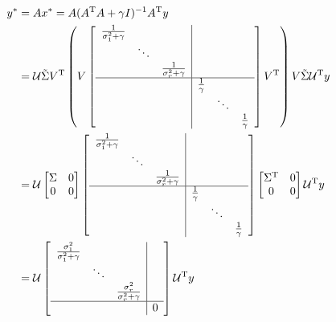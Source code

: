 \begin{align*}
y^* &= Ax^* = A(A^{\trans}A + \gamma I)^{-1}A^{\trans}y\\
&= \mathcal{U}\tilde{\Sigma}V^{\trans}\left(V
\left[
\begin{array}{c|c}
\begin{matrix}
\frac{1}{\sigma_1^2+\gamma} & &\\
&\ddots&\\
&&\frac{1}{\sigma_r^2+\gamma}
\end{matrix}&  \\ \hline 
& \begin{matrix}
\frac{1}{\gamma} & &\\
&\ddots&\\
&&\frac{1}{\gamma}
\end{matrix}
\end{array}
\right]
V^{\trans}\right)V\tilde{\Sigma}\mathcal{U}^{\trans}y\\
&= \mathcal{U}
\begin{bmatrix}
\Sigma & 0\\
0 & 0
\end{bmatrix}
\left[
\begin{array}{c|c}
\begin{matrix}
\frac{1}{\sigma_1^2+\gamma} & &\\
&\ddots&\\
&&\frac{1}{\sigma_r^2+\gamma}
\end{matrix}&  \\ \hline 
& \begin{matrix}
\frac{1}{\gamma} & &\\
&\ddots&\\
&&\frac{1}{\gamma}
\end{matrix}
\end{array}
\right]
\begin{bmatrix}
\Sigma^{\trans} & 0\\
0 & 0
\end{bmatrix}
\mathcal{U}^{\trans}y\\
&= \mathcal{U}
\left[
\begin{array}{c|c}
\begin{matrix}
\frac{\sigma_1^2}{\sigma_1^2+\gamma} & &\\
&\ddots&\\
&&\frac{\sigma_r^2}{\sigma_r^2+\gamma}
\end{matrix}&  \\ \hline 
& 0
\end{array}
\right]
\mathcal{U}^{\trans}y
\\

\end{align*}
